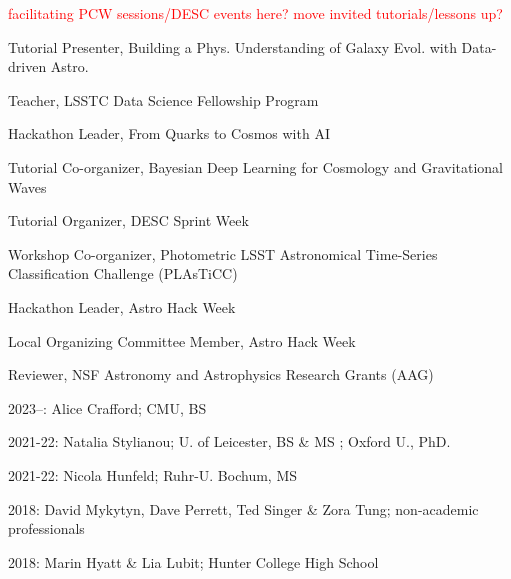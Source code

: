 \documentclass[11pt,letterpaper]{article}
\begin{document}
{\fontsize{9pt}{5pt}\selectfont\textcolor{red}{facilitating PCW sessions/DESC events here? move invited tutorials/lessons up?}}
\nopagebreak\begin{list}{}{\malzlist}
	\item Tutorial Presenter, Building a Phys. Understanding of Galaxy Evol. with Data-driven Astro. 
	\item Teacher, LSSTC Data Science Fellowship Program 
	\item Hackathon Leader, From Quarks to Cosmos with AI 
	\item Tutorial Co-organizer, Bayesian Deep Learning for Cosmology and Gravitational Waves 
	\item Tutorial Organizer, DESC Sprint Week 
	\item Workshop Co-organizer, Photometric LSST Astronomical Time-Series Classification Challenge (PLAsTiCC) 
	\item Hackathon Leader, Astro Hack Week 
	\item Local Organizing Committee Member, Astro Hack Week 
	\item Reviewer, NSF Astronomy and Astrophysics Research Grants (AAG) 
\end{list}

\begin{list}{}{\malzlist}
	\item 2023--: Alice Crafford; CMU, BS 
	\item 2021-22: Natalia Stylianou; U. of Leicester, BS \& MS ; Oxford U., PhD. 
	\item 2021-22: Nicola Hunfeld; Ruhr-U. Bochum, MS 
	\item 2018: David Mykytyn, Dave Perrett, Ted Singer \& Zora Tung; non-academic professionals
	\item 2018: Marin Hyatt \& Lia Lubit; Hunter College High School 
\end{list}
\end{document}
